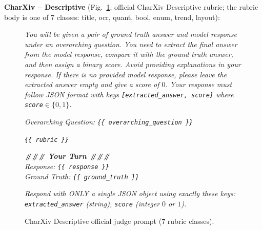 \textbf{CharXiv -- Descriptive} (Fig.~\ref{fig:prompt-judge-charxiv-d}; official CharXiv Descriptive rubric; the rubric body is one of 7 classes: title, ocr, quant, bool, enum, trend, layout):
\begin{figure}[!htbp]
\begin{prompttemplatefig}
\small
\emph{You will be given a pair of ground truth answer and model response under an overarching question. You need to extract the final answer from the model response, compare it with the ground truth answer, and then assign a binary score. Avoid providing explanations in your response. If there is no provided model response, please leave the extracted answer empty and give a score of $0$. Your response must follow JSON format with keys \texttt{[extracted\_answer, score]} where \texttt{score}$\in\{0,1\}$.}

\emph{Overarching Question: \texttt{\{\{ overarching\_question \}\}}}

\emph{\texttt{\{\{ rubric \}\}}}

\emph{\textbf{\#\#\# Your Turn \#\#\#}\\
Response: \texttt{\{\{ response \}\}}\\
Ground Truth: \texttt{\{\{ ground\_truth \}\}}}

\emph{Respond with ONLY a single JSON object using exactly these keys: \texttt{extracted\_answer} (string), \texttt{score} (integer $0$ or $1$).}
\end{prompttemplatefig}
\caption{CharXiv Descriptive official judge prompt (7 rubric classes).}
\label{fig:prompt-judge-charxiv-d}
\end{figure}
